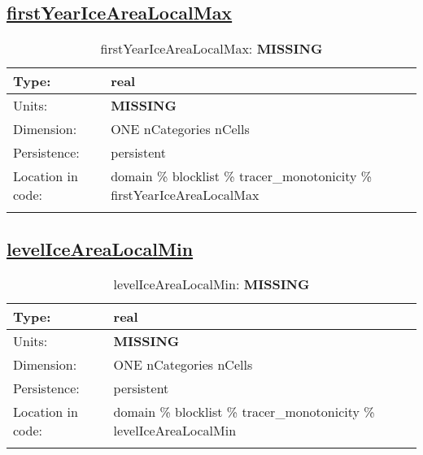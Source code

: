 \subsection[firstYearIceAreaLocalMax]{\hyperref[sec:var_tab_tracer_monotonicity]{firstYearIceAreaLocalMax}}
\label{subsec:var_sec_tracer_monotonicity_firstYearIceAreaLocalMax}
\begin{center}
\begin{longtable}{| p{2.0in} | p{4.0in} |}
        \hline 
        Type: & real \\
        \hline 
        Units: & {\bf \color{red} MISSING} \\
        \hline 
        Dimension: & ONE nCategories nCells \\
        \hline 
        Persistence: & persistent \\
        \hline 
         Location in code: & domain \% blocklist \% tracer\_monotonicity \% firstYearIceAreaLocalMax \\
         \hline 
    \caption{firstYearIceAreaLocalMax: {\bf \color{red} MISSING}}
\end{longtable}
\end{center}
\subsection[levelIceAreaLocalMin]{\hyperref[sec:var_tab_tracer_monotonicity]{levelIceAreaLocalMin}}
\label{subsec:var_sec_tracer_monotonicity_levelIceAreaLocalMin}
\begin{center}
\begin{longtable}{| p{2.0in} | p{4.0in} |}
        \hline 
        Type: & real \\
        \hline 
        Units: & {\bf \color{red} MISSING} \\
        \hline 
        Dimension: & ONE nCategories nCells \\
        \hline 
        Persistence: & persistent \\
        \hline 
         Location in code: & domain \% blocklist \% tracer\_monotonicity \% levelIceAreaLocalMin \\
         \hline 
    \caption{levelIceAreaLocalMin: {\bf \color{red} MISSING}}
\end{longtable}
\end{center}
